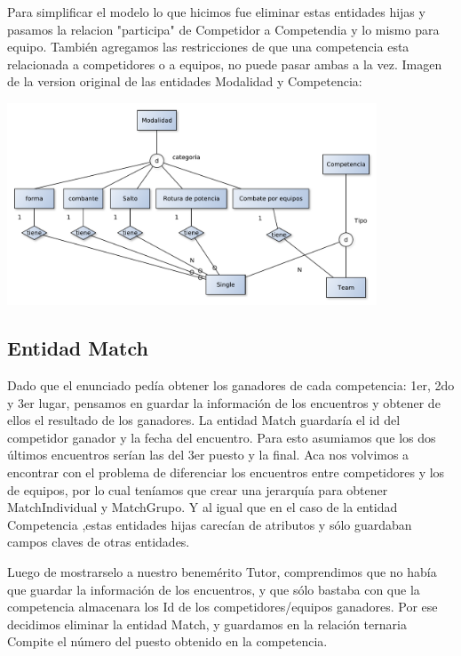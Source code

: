 Para simplificar el modelo lo que hicimos fue eliminar estas entidades hijas y pasamos la relacion "participa" de Competidor a Competendia y lo mismo para equipo. También agregamos las restricciones de que una competencia esta relacionada a competidores o a equipos, no puede pasar ambas a la vez.
Imagen de la version original de las entidades Modalidad y Competencia:\\
\begin{center}
\includegraphics[width=11cm,keepaspectratio]{./imagenes/des1.pdf}\newline
\end{center}

\subsection{Entidad Match}

Dado que el enunciado ped\'ia obtener los ganadores de cada competencia: 1er, 2do y 3er lugar, pensamos en guardar la informaci\'on de los encuentros y obtener de ellos el resultado de los ganadores. La entidad Match guardar\'ia el id del competidor ganador y la fecha del encuentro. Para esto asumiamos que los dos \'ultimos encuentros ser\'ian las del 3er puesto y la final. Aca nos volvimos a encontrar con el problema de diferenciar los encuentros entre competidores y los de equipos, por lo cual teníamos que crear una jerarquía para obtener MatchIndividual y MatchGrupo. Y al igual que en el caso de la entidad Competencia ,estas entidades hijas carecían de atributos y s\'olo guardaban campos claves de otras entidades.

Luego de mostrarselo a nuestro benemérito Tutor, comprendimos que no había que guardar la información de los encuentros, y que s\'olo bastaba con que la competencia almacenara los Id de los competidores/equipos ganadores. Por ese decidimos eliminar la entidad Match, y guardamos en la relaci\'on ternaria Compite el n\'umero del puesto obtenido en la competencia.

